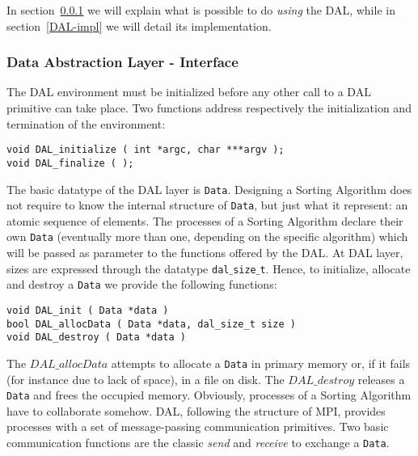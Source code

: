 
In section~\ref{DAL-int} we will explain what is possible to do \textit{using} the DAL, while in section~\ref{DAL-impl} we will detail its implementation. 

\subsubsection{Data Abstraction Layer - Interface}
\label{DAL-int}
The DAL environment must be initialized before any other call to a DAL primitive can take place. Two functions address respectively the initialization and termination of the environment:
\begin{lstlisting}
void DAL_initialize ( int *argc, char ***argv );
void DAL_finalize ( );
\end{lstlisting}
The basic datatype of the DAL layer is \texttt{Data}. Designing a Sorting Algorithm does not require to know the internal structure of \texttt{Data}, but just what it represent: an atomic sequence of elements. The processes of a Sorting Algorithm declare their own \texttt{Data} (eventually more than one, depending on the specific algorithm) which will be passed as parameter to the functions offered by the DAL. At DAL layer, sizes are expressed through the datatype \texttt{dal$\_$size$\_$t}. Hence, to initialize, allocate and destroy a \texttt{Data} we provide the following functions:
\begin{lstlisting}
void DAL_init ( Data *data )
bool DAL_allocData ( Data *data, dal_size_t size )
void DAL_destroy ( Data *data )
\end{lstlisting}
The $DAL\_allocData$ attempts to allocate a \texttt{Data} in primary memory or, if it fails (for instance due to lack of space), in a file on disk. The $DAL\_destroy$ releases a \texttt{Data} and frees the occupied memory. 
Obviously, processes of a Sorting Algorithm have to collaborate somehow. DAL, following the structure of MPI, provides processes with a set of message-passing communication primitives. Two basic communication functions are the classic \textit{send} and \textit{receive} to exchange a \texttt{Data}.
